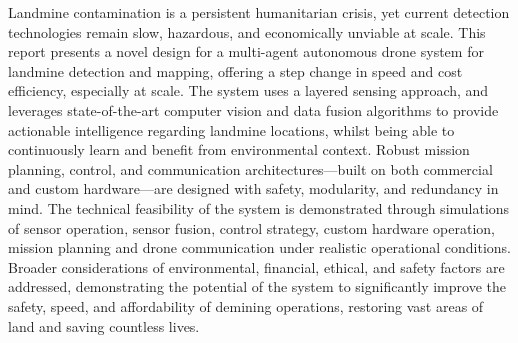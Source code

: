 Landmine contamination is a persistent humanitarian crisis, yet current detection technologies remain slow, hazardous, and economically unviable at scale. This report presents a novel design for a multi-agent autonomous drone system for landmine detection and mapping, offering a step change in  speed and cost efficiency, especially at scale. The system uses a layered sensing approach, and leverages state-of-the-art computer vision and data fusion algorithms to provide actionable intelligence regarding landmine locations, whilst being able to continuously learn and benefit from environmental context. Robust mission planning, control, and communication architectures—built on both commercial and custom hardware—are designed with safety, modularity, and redundancy in mind. The technical feasibility of the system is demonstrated through simulations of sensor operation, sensor fusion, control strategy, custom hardware operation, mission planning and drone communication under realistic operational conditions. Broader considerations of environmental, financial, ethical, and safety factors are addressed, demonstrating the potential of the system to significantly improve the safety, speed, and affordability of demining operations, restoring vast areas of land and saving countless lives.